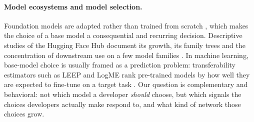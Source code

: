 \paragraph{Model ecosystems and model selection.}
Foundation models are adapted rather than trained from scratch \citep{bommasani2021opportunities}, which makes the
choice of a base model a consequential and recurring decision. Descriptive studies of the Hugging Face Hub document
its growth, its family trees and the concentration of downstream use on a few model families
\citep{osborne2024ai,laufer2025anatomy}. In machine learning, base-model choice is usually framed as a prediction
problem: transferability estimators such as LEEP and LogME rank pre-trained models by how well they are expected to
fine-tune on a target task \citep{nguyen2020leep,you2021logme}. Our question is complementary and behavioral: not
which model a developer \emph{should} choose, but which signals the choices developers actually make respond to,
and what kind of network those choices grow.
